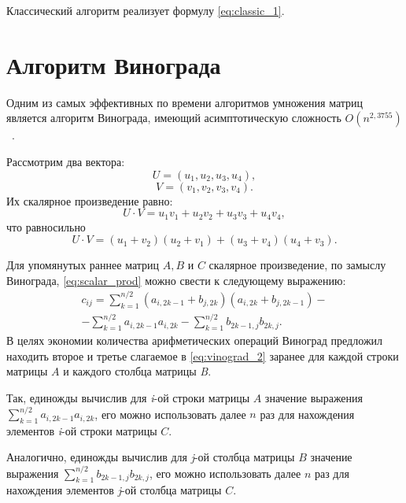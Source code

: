 Классический алгоритм реализует формулу \ref{eq:classic_1}.

\section{Алгоритм Винограда}
Одним из самых эффективных по времени алгоритмов умножения матриц является алгоритм Винограда, имеющий асимптотическую сложность $O(n^{2,3755})$~\cite{vinograd-haskell}.

Рассмотрим два вектора:
\begin{equation}
    U = (u_{1}, u_{2}, u_{3}, u_{4}),
\end{equation}
\begin{equation}
    V = (v_{1}, v_{2}, v_{3}, v_{4}).
\end{equation}
Их скалярное произведение равно:
\begin{equation}
    \label{eq:scalar_prod}
    U \cdot V = u_{1}v_{1} + u_{2}v_{2} + u_{3}v_{3} + u_{4}v_{4},
\end{equation}
что равносильно
\begin{equation}
    \label{eq:vinograd_1}
    U \cdot V = (u_{1} + v_{2})(u_{2} + v_{1}) + (u_{3} + v_{4})(u_{4} + v_{3}).
\end{equation}

Для упомянутых раннее матриц $A, B$ и $C$ скалярное произведение, по замыслу Винограда, \ref{eq:scalar_prod} можно свести к следующему выражению:
\begin{multline}
    \label{eq:vinograd_2}
    c_{ij} = \sum_{k = 1}^{n / 2}(a_{i,2k - 1} + b_{j, 2k})(a_{i,2k} + b_{j, 2k - 1}) - \\ - \sum_{k = 1}^{n / 2}a_{i,2k - 1}a_{i,2k} - \sum_{k = 1}^{n / 2}b_{2k - 1,j}b_{2k,j}.
\end{multline}
В целях экономии количества арифметических операций Виноград предложил находить второе и третье слагаемое в \ref{eq:vinograd_2} заранее для каждой строки матрицы $A$ и каждого столбца матрицы \textit{B}.

Так, единожды вычислив для \textit{i}-ой строки матрицы $A$ значение выражения $\sum_{k = 1}^{n / 2}a_{i,2k - 1}a_{i,2k}$, его можно использовать далее $n$ раз для нахождения элементов \textit{i}-ой строки матрицы $C$.  

Аналогично, единожды вычислив для \textit{j}-ой столбца матрицы $B$ значение выражения $\sum_{k = 1}^{n / 2}b_{2k - 1,j}b_{2k,j}$, его можно использовать далее $n$ раз для нахождения элементов \textit{j}-ой столбца матрицы $C$.

